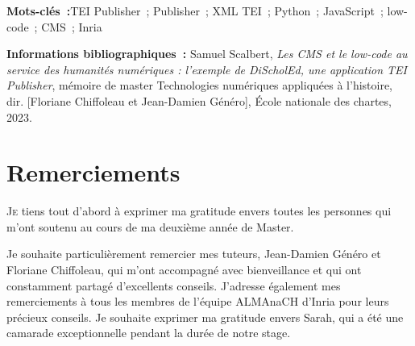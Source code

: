 \documentclass[a4paper,12pt,twoside]{book}
\newcommand{\clearemptydoublepage}{\newpage{\pagestyle{empty}\cleardoublepage}}
\begin{document}
	\textbf{Mots-clés~:}TEI Publisher~; Publisher~; XML TEI~; Python~; JavaScript~; low-code~; CMS~; Inria
	
	\textbf{Informations bibliographiques~:} Samuel Scalbert, \textit{Les CMS et le low-code au service des humanités numériques : l'exemple de DiScholEd, une application TEI Publisher}, mémoire de master \og{}Technologies numériques appliquées à l'histoire\fg{}, dir. [Floriane Chiffoleau et Jean-Damien Généro], École nationale des chartes, 2023.
	
	\clearemptydoublepage
	
	\chapter{Remerciements}
	
	\lettrine{J}e tiens tout d'abord à exprimer ma gratitude envers toutes les personnes qui m'ont soutenu au cours de ma deuxième année de Master.

Je souhaite particulièrement remercier mes tuteurs, Jean-Damien Généro et Floriane Chiffoleau, qui m'ont accompagné avec bienveillance et qui ont constamment partagé d'excellents conseils. J'adresse également mes remerciements à tous les membres de l'équipe ALMAnaCH d'Inria pour leurs précieux conseils. Je souhaite exprimer ma gratitude envers Sarah, qui a été une camarade exceptionnelle pendant la durée de notre stage.

    
	\clearemptydoublepage
 
	
	\clearemptydoublepage
    \printbibliography[heading=bibintoc,keyword=main,title={Bibliographie générale}]
    \printbibliography[heading=bibintoc,keyword=site,title={Sites Internet}]
	\clearemptydoublepage
 
	\mainmatter
	
	
    
    \clearemptydoublepage
    
    \clearemptydoublepage
    
    \clearemptydoublepage
    
    \clearemptydoublepage
    
	\clearemptydoublepage
 
    \backmatter
	
    
    

\printglossaries

\listoffigures
{}

\tableofcontents
{}
	
\end{document}
